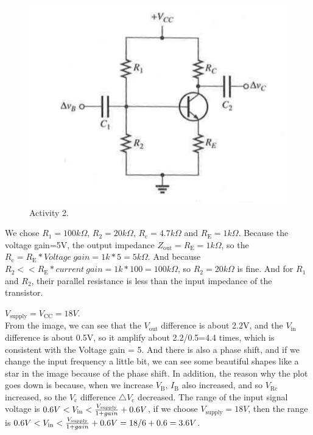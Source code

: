 \documentclass[11pt]{article}
\begin{document}
\begin{figure}[H]
 \begin{center}
  \includegraphics[width=\linewidth/1]{act2figure}
  \caption{Activity 2.}
  \label{fig:act2figure}
 \end{center}
\end{figure}

We chose $R_{\mathrm{1}}=100k \Omega$, $R_{\mathrm{2}}=20k \Omega$, $R_{\mathrm{c}}=4.7k \Omega$ and $R_{\mathrm{E}}=1k \Omega$. Because the voltage gain=5V, the output impedance $Z_{\mathrm{out}}=R_{\mathrm{E}}=1k \Omega$, so the $R_{\mathrm{c}}=R_{\mathrm{E}}*Voltage \ gain=1k*5=5k \Omega$. And because $R_{\mathrm{2}}<<R_{\mathrm{E}}*current \ gain=1k*100=100k \Omega$, so $R_{\mathrm{2}}=20k \Omega$ is fine. And for $R_{\mathrm{1}}$ and $R_{\mathrm{2}}$, their parallel resistance is less than the input impedance of the transistor.

$V_{\mathrm{supply}}=V_{\mathrm{CC}}=18V$. \\

From the image, we can see that the $V_{\mathrm{out}}$ difference is about 2.2V, and the $V_{\mathrm{in}}$ difference is about 0.5V, so it amplify about 2.2/0.5=4.4 times, which is consistent with the Voltage gain = 5. And there is also a phase shift, and if we change the input frequency a little bit, we can see some beautiful shapes like a star in the image because of the phase shift. In addition, the reason why the plot goes down is because, when we increase $V_{\mathrm{B}}$, $I_{\mathrm{B}}$ also increased, and so $V_{\mathrm{Rc}}$ increased, so the $V_{\mathrm{c}}$ difference  $\triangle V_{\mathrm{c}}$ decreased. The range of the input signal voltage is $0.6V<V_{\mathrm{in}}<{V_{\mathrm{supply}} \over {1+gain}}+0.6V$, if we choose $V_{\mathrm{supply}}=18V$, then the range is $0.6V<V_{\mathrm{in}}<{V_{\mathrm{supply}} \over {1+gain}}+0.6V=18/6+0.6=3.6V$.
\end{document}
